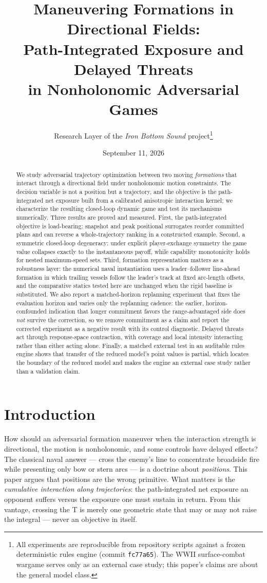 \documentclass[12pt,a4paper]{article}
\title{Maneuvering Formations in Directional Fields:\\
Path-Integrated Exposure and Delayed Threats\\
in Nonholonomic Adversarial Games}
\author{Research Layer of the \emph{Iron Bottom Sound} project\thanks{All
experiments are reproducible from repository scripts against a frozen
deterministic rules engine (commit \texttt{fc77a65}).  The WWII surface-combat
wargame serves only as an external case study; this paper's
claims are about the general model class.}}
\date{September 11, 2026}
\begin{document}
\maketitle

\begin{abstract}
We study adversarial trajectory optimization between two moving
\emph{formations} that interact through a directional field under
nonholonomic motion constraints.  The decision variable is not a position but
a trajectory, and the objective is the path-integrated net exposure built
from a calibrated anisotropic interaction kernel; we characterize the
resulting closed-loop dynamic game and test its mechanisms numerically.
Three results are proved and measured.  First, the path-integrated objective
is load-bearing: snapshot and peak positional surrogates reorder committed
plans and can reverse a whole-trajectory ranking in a constructed example.
Second, a symmetric closed-loop degeneracy: under explicit player-exchange
symmetry the game value collapses exactly to the instantaneous payoff, while
capability monotonicity holds for nested maximum-speed sets.  Third, formation
representation matters as a robustness layer: the numerical naval
instantiation uses a leader--follower line-ahead formation in which trailing
vessels follow the leader's track at fixed arc-length offsets, and the
comparative statics tested here are unchanged when the rigid baseline is
substituted.  We also report a matched-horizon replanning experiment that
fixes the evaluation horizon and varies only the replanning cadence: the
earlier, horizon-confounded indication that longer commitment favors the
range-advantaged side does \emph{not} survive the correction, so we remove
commitment as a claim and report the corrected experiment as a negative
result with its control diagnostic.  Delayed threats act through
response-space contraction, with coverage and local intensity interacting
rather than either acting alone.  Finally, a matched external test in an
auditable rules engine shows that transfer of the reduced model's point
values is partial, which locates the boundary of the reduced model and makes
the engine an external case study rather than a validation claim.
\end{abstract}

\section{Introduction}\label{sec:intro}

How should an adversarial formation maneuver when the interaction strength
is directional, the motion is nonholonomic, and some controls have delayed
effects?  The classical naval answer --- cross the enemy's line to concentrate
broadside fire while presenting only bow or stern arcs --- is a doctrine about
\emph{positions}.  This paper argues that positions are the wrong primitive.
What matters is the \emph{cumulative interaction along trajectories}: the
path-integrated net exposure an opponent suffers versus the exposure one must
sustain in return.  From this vantage, crossing the T is merely one geometric
state that may or may not raise the integral --- never an objective in itself.
\end{document}

